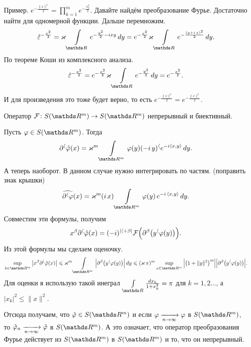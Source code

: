 Пример. $e^{-\frac{\|x\|^2}2} = \prod\limits_{k=1}^me^{-\frac{x_k^2}2}$. Давайте найдём преобразование Фурье. Достаточно найти для одномерной функции. Дальше перемножим.
\[
  \hat\e^{-\frac{x^2}2} = \varkappa\Gint\R e^{-\frac{y^2}2-ixy}\,dy = 
  e^{-\frac {x^2}2}\varkappa\Gint\R e^{-\frac{(y+i\,x)^2}2}\,dy.
\]
По теореме Коши из комплексного анализа.
\[\hat\e^{-\frac{x^2}2} = 
  e^{-\frac{x^2}2}\varkappa\Gint\R e^{-\frac{y^2}2}\,dy = e^{-\frac{x^2}2}.
\]
И для произведения это тоже будет верно, то есть 
$e^{-\frac{\|x\|^2}2}=e^{-\frac{\|x\|^2}2}$.
\begin{Lem}
  Оператор $\mathcal F\colon S(\R^m)\to S(\R^m)$ непрерывный и биективный.
\end{Lem}
\begin{Proof}
  Пусть $\phi\in S(\R^m)$. Тогда 
\[
\dl^\a\hat\phi(x) = \varkappa^m\Gint{\R^m}\phi(y)(-i\,y)^\a e^{-i\la x,y\ra}\,dy.
\]
А теперь наоборот. В данном случае нужно интегрировать по частям. (поправить знак крышки)
\[
  \widehat{\dl^\a\phi}(x) = \varkappa^m(i\,x)\Gint{\R^m}\phi(y)\,e^{-i\,\la x,y\ra}\,dy.
\]
Совместим эти формулы, получим
\[
  x^\beta\partial^\langle\hat{\varphi}(x) = (-i)^{|\langle+\beta|}\mathcal F\Big(\partial^\beta\big(y^\langle\varphi(y)\big)\Big).
\]
Из этой формулы мы сделаем оценочку.
\[
  \sup\limits_{\l\in\R^m}\big|x^\b\dl^\a\hat\phi(x)\big|\le\varkappa^m\Gint{\R^m}\Big|\dl^\b\big(y^\a\phi(y)\big)\Big|\,dy\le
  (\varkappa\,\pi)^m\sup\limits_{x\in\R^m} \Big|\big(1+\|y\|^2\big)^m\Big|\Big|\dl^\b\big(y^\a\phi(y)\big)\Big|.
\]
Для оценки я использую такой инеграл $\Gint\R\frac{dx_k}{1+x_k^2} = \pi$ для $k=1,2\dots$, а $|x_k|^2\le \|x\|^2$.

Отсюда получаем, что $\hat\phi\in S(\R^m)$ и если $\varphi\xrightarrow[n\rightarrow\infty]{}\varphi$ в $S(\R^m)$, то $\hat{\varphi}_n\xrightarrow[n\rightarrow\infty]{} \hat{\varphi}$ в $S(\R^m)$. А это означает, что оператор преобразования Фурье действует из $S(\R^m)$ в $S(\R^m)$ и то, что он непрерывный.


\end{Proof}
